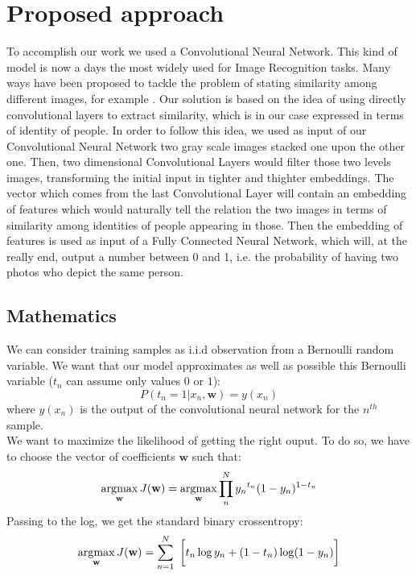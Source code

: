 \section{Proposed approach}
To accomplish our work we used a Convolutional Neural Network. This kind of model is now a days the most widely used for Image Recognition tasks. Many ways have been proposed to tackle the problem of stating similarity among different images, for example . Our solution is based on the idea of using directly convolutional layers to extract similarity, which is in our case expressed in terms of identity of people. In order to follow this idea, we used as input of our Convolutional Neural Network two gray scale images stacked one upon the other one. Then, two dimensional Convolutional Layers would filter those two levels images, transforming the initial input in tighter and thighter embeddings. The vector which comes from the last Convolutional Layer will contain an embedding of features which would naturally tell the relation the two images in terms of similarity among identities of people appearing in those. Then the embedding of features is used as input of a Fully Connected Neural Network, which will, at the really end, output a number between 0 and 1, i.e. the probability of having two photos who depict the same person.

\subsection{Mathematics}
We can consider training samples as i.i.d observation from a Bernoulli random variable. We want that our model approximates as well as possible this Bernoulli variable ($t_n$ can assume only values $0$ or $1$):
\begin{equation}
P(t_n = 1|x_n, \textbf{w}) = y(x_n)
\end{equation}
where $y(x_n)$ is the output of the convolutional neural network for the $n^{th}$ sample.
\\
We want to maximize the likelihood of getting the right ouput. To do so, we have to choose the vector of coefficients $\textbf{w}$ such that:
\begin{equation}
\operatorname*{\arg\!\max} _{\textbf{w}} J(\textbf{w}) = \operatorname*{\arg\!\max} _{\textbf{w}} \prod _n^N {y_n}^{t_n}(1-y_n)^{1-t_n}
\end{equation}
Passing to the log, we get the standard binary crossentropy:
\begin{equation}
\operatorname*{\arg\!\max} _{\textbf{w}} J(\textbf{w}) = \sum _{n=1}^{N}\ {\bigg [}t_{n}\log {y_n}+(1-t_{n})\log(1-{y_n}){\bigg ]}
\end{equation}

